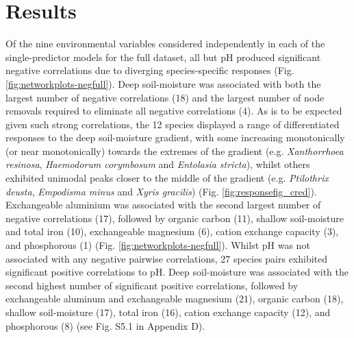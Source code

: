 \section{Results}

Of the nine environmental variables considered independently in each of the single-predictor models for the full dataset, all but pH produced significant negative correlations due to diverging species-specific responses (Fig. \ref{fig:networkplots-negfull}). Deep soil-moisture was associated with both the largest number of negative correlations (18) and the largest number of node removals required to eliminate all negative correlations (4). As is to be expected given such strong correlations, the 12 species displayed a range of differentiated responses to the deep soil-moisture gradient, with some increasing monotonically (or near monotonically) towards the extremes of the gradient (e.g. \textit{Xanthorrhoea resinosa}, \textit{Haemodorum corymbosum} and \textit{Entolasia stricta}), whilst others exhibited unimodal peaks closer to the middle of the gradient (e.g. \textit{Ptilothrix deusta}, \textit{Empodisma minus} and \textit{Xyris gracilis}) (Fig. \ref{fig:responsefig_cred}). Exchangeable aluminium was associated with the second largest number of negative correlations (17), followed by organic carbon (11), shallow soil-moisture and total iron (10), exchangeable magnesium (6), cation exchange capacity (3), and phosphorous (1) (Fig. \ref{fig:networkplots-negfull}). Whilst pH was not associated with any negative pairwise correlations, 27 species pairs exhibited significant positive correlations to pH. Deep soil-moisture was associated with the second highest number of significant positive correlations, followed by exchangeable aluminum and exchangeable magnesium (21), organic carbon (18), shallow soil-moisture (17), total iron (16), cation exchange capacity (12), and phosphorous (8) (see Fig. S5.1 in Appendix D).
 
